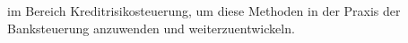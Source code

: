 im Bereich {Kreditrisikosteuerung}, um diese Methoden in der Praxis {der Banksteuerung} anzuwenden und weiterzuentwickeln.